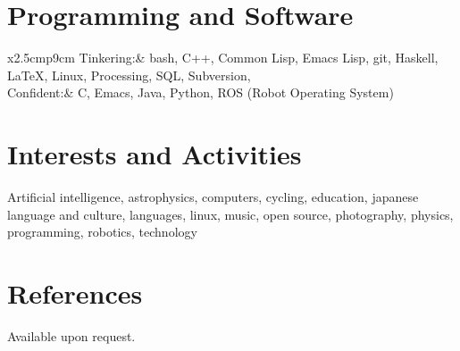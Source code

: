 \documentclass[a4paper,10pt]{article}
\begin{document}
\section{Programming and Software}
\begin{tabular}{x{2.5cm}p{9cm}}
  Tinkering:& bash, C++, Common Lisp, Emacs Lisp, git, Haskell, \LaTeX, Linux, Processing, SQL, Subversion, \XeTeX\\
  Confident:& C, Emacs, Java, Python, ROS (Robot Operating System)
\end{tabular}

\section{Interests and Activities}
Artificial intelligence, astrophysics, computers, cycling, education, japanese language and culture, languages, linux, music, open source, photography, physics, programming, robotics, technology
\section{References}
Available upon request.
\end{document}
